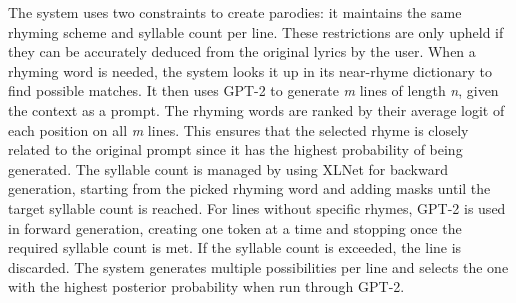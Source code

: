 The system uses two constraints to create parodies: it maintains the same rhyming scheme and syllable count per line. These restrictions are only upheld if they can be accurately deduced from the original lyrics by the user. When a rhyming word is needed, the system looks it up in its near-rhyme dictionary to find possible matches. It then uses GPT-2 to generate \textit{m} lines of length \textit{n}, given the context as a prompt. The rhyming words are ranked by their average logit of each position on all \textit{m} lines. This ensures that the selected rhyme is closely related to the original prompt since it has the highest probability of being generated. The syllable count is managed by using XLNet for backward generation, starting from the picked rhyming word and adding masks until the target syllable count is reached. For lines without specific rhymes, GPT-2 is used in forward generation, creating one token at a time and stopping once the required syllable count is met. If the syllable count is exceeded, the line is discarded. The system generates multiple possibilities per line and selects the one with the highest posterior probability when run through GPT-2.

